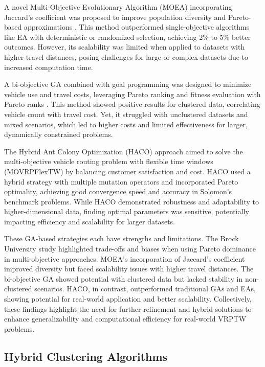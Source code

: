 A novel Multi-Objective Evolutionary Algorithm (MOEA) incorporating Jaccard’s coefficient was proposed to improve population diversity and Pareto-based approximations \cite{Garcia-Najera_Bullinaria_2011}. This method outperformed single-objective algorithms like EA with deterministic or randomized selection, achieving 2\% to 5\% better outcomes. However, its scalability was limited when applied to datasets with higher travel distances, posing challenges for large or complex datasets due to increased computation time.

A bi-objective GA combined with goal programming was designed to minimize vehicle use and travel costs, leveraging Pareto ranking and fitness evaluation with Pareto ranks \cite{Ghoseiri_Ghannadpour_2010}. This method showed positive results for clustered data, correlating vehicle count with travel cost. Yet, it struggled with unclustered datasets and mixed scenarios, which led to higher costs and limited effectiveness for larger, dynamically constrained problems.

The Hybrid Ant Colony Optimization (HACO) approach \cite{Zhang_Zhang_Ma_Zhang_Liu_2019} aimed to solve the multi-objective vehicle routing problem with flexible time windows (MOVRPFlexTW) by balancing customer satisfaction and cost. HACO used a hybrid strategy with multiple mutation operators and incorporated Pareto optimality, achieving good convergence speed and accuracy in Solomon’s benchmark problems. While HACO demonstrated robustness and adaptability to higher-dimensional data, finding optimal parameters was sensitive, potentially impacting efficiency and scalability for larger datasets.

These GA-based strategies each have strengths and limitations. The Brock University study highlighted trade-offs and biases when using Pareto dominance in multi-objective approaches. MOEA's incorporation of Jaccard’s coefficient improved diversity but faced scalability issues with higher travel distances. The bi-objective GA showed potential with clustered data but lacked stability in non-clustered scenarios. HACO, in contrast, outperformed traditional GAs and EAs, showing potential for real-world application and better scalability. Collectively, these findings highlight the need for further refinement and hybrid solutions to enhance generalizability and computational efficiency for real-world VRPTW problems.


\subsection{Hybrid Clustering Algorithms}

